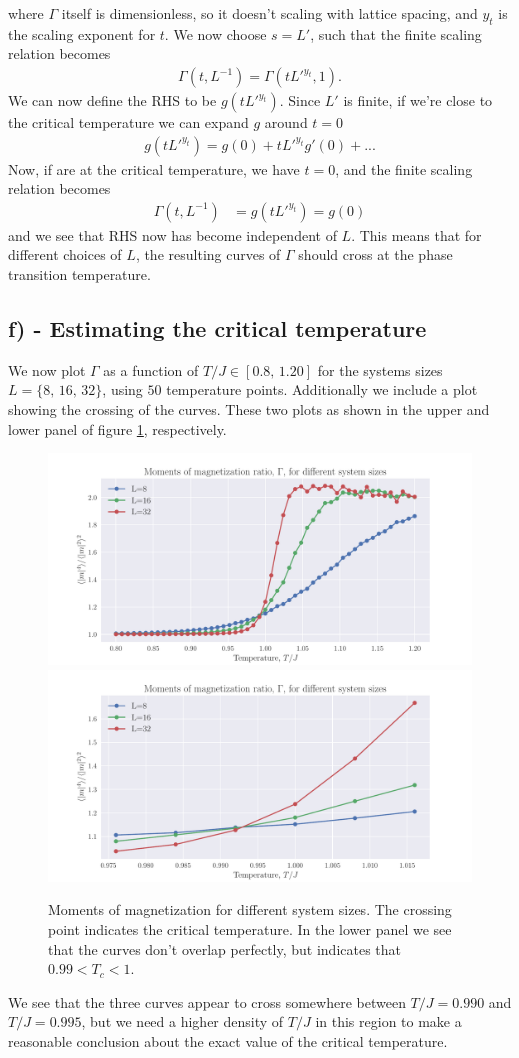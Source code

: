 \documentclass[reprint,english,notitlepage,aps,nobalancelastpage,nofootinbib]{revtex4-1}
\newcommand{\tj}{T/J}
\begin{document}
where $\Gamma$ itself is dimensionless, so it doesn't scaling with lattice spacing, and $y_t$ is the scaling exponent for $t$. We now choose $s=L'$, such that the finite scaling relation becomes 
\begin{align*}
	\Gamma(t,L^{-1}) = \Gamma(t L'^{y_t},1). 
\end{align*}   
We can now define the RHS to be $g(t L'^{y_t})$. Since $L'$ is finite, if we're close to the critical temperature we can expand $g$ around $t=0$
\begin{align*}
	g(t L'^{y_t}) = g(0) + t L'^{y_t} g'(0) + ... 
\end{align*}
Now, if are at the critical temperature, we have $t=0$, and the finite scaling relation becomes 
\begin{align*}
	\Gamma(t,L^{-1}) &= g(t L'^{y_t}) = g(0)
\end{align*}
and we see that RHS now has become independent of $L$. This means that for different choices of $L$, the resulting curves of $\Gamma$ should cross at the phase transition temperature. 

\subsection*{f) - Estimating the critical temperature}
We now plot $\Gamma$ as a function of $\tj\in[0.8,\,1.20]$ for the systems sizes $L=\{8,\,16,\,32\}$, using $50$ temperature points. Additionally we include a plot showing the crossing of the curves. These two plots as shown in the upper and lower panel of figure \ref{fig:gamma}, respectively.

\begin{figure}[h!]
	\centering
	\includegraphics[width=0.7\linewidth]{gamma_curves_N51_dT04.pdf}
	\includegraphics[width=0.7\linewidth]{gamma_curves_N6_dT004.pdf}
	\caption{Moments of magnetization for different system sizes. The crossing point indicates the critical temperature. In the lower panel we see that the curves don't overlap perfectly, but indicates that $0.99< T_c < 1$.}
	\label{fig:gamma}
\end{figure}
We see that the three curves appear to cross somewhere between $\tj=0.990$ and $\tj=0.995$, but we need a higher density of $\tj$ in this region to make a reasonable conclusion about the exact value of the critical temperature.
\end{document}

